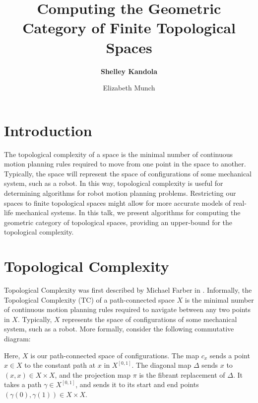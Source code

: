 \documentclass[11pt]{article}
\title{Computing the Geometric Category of Finite Topological Spaces}
\author[1]{\textbf{Shelley Kandola}}
\author[2,1]{Elizabeth Munch}
\affil[1]{Dept.~of Mathematics}
\affil[2]{Dept.~of Computational Math, Science, and Engineering}
\affil[\phatom{}]{Michigan State University}
\date{}
\begin{document}
\maketitle
\vspace{-.5in} %
\section{Introduction}
The topological complexity of a space is the minimal number of continuous motion planning rules required to move from one point in the space to another.
Typically, the space will represent the space of configurations of some mechanical system, such as a robot.
In this way, topological complexity is useful for determining algorithms for robot motion planning problems.
Restricting our spaces to finite topological spaces might allow for more accurate models of real-life mechanical systems.
In this talk, we present algorithms for computing the geometric category of topological spaces, providing an upper-bound for the topological complexity.

\section{Topological Complexity}

Topological Complexity was first described by Michael Farber in \cite{Farber2001}.
Informally, the Topological Complexity (TC) of a path-connected space $X$ is the minimal number of continuous motion planning rules required to navigate between any two points in $X$. Typically, $X$ represents the space of configurations of some mechanical system, such as a robot.
More formally, consider the following commutative diagram:

\begin{center}
\end{center}


Here, $X$ is our path-connected space of configurations.
The map $c_x$ sends a point $x\in X$ to the constant path at $x$ in $X^{[0,1]}$.
The diagonal map $\Delta$ sends $x$ to $(x,x)\in X \times X$, and the projection map $\pi$ is the fibrant replacement of $\Delta$.
It takes a path $\gamma \in X^{[0,1]}$, and sends it to its start and end points $(\gamma(0),\gamma(1)) \in X \times X$.
\end{document}
